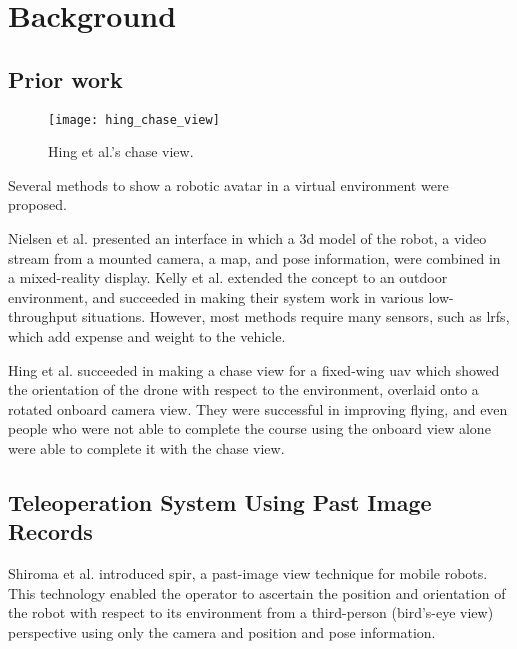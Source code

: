 \chapter{Background}
\label{ch:background}

\section{Prior work}

  \begin{wrapfigure}{r}{0.5\textwidth}
    \centering
    \texttt{[image: hing\_chase\_view]}
    \caption[Hing et al. chase view]{Hing et al.'s chase view.\cite{hing2009}}
    \label{fig:hing_chase_view}
  \end{wrapfigure}

  Several methods to show a robotic avatar in a virtual environment were proposed.

  Nielsen et al. presented an interface in which a \gls{3d} model of the robot, a video stream from a mounted camera, a map, and pose information, were combined in a mixed-reality display.\cite{nielsen2007}
  Kelly et al. extended the concept to an outdoor environment, and succeeded in making their system work in various low-throughput situations.\cite{kelly2011}
  However, most methods require many sensors, such as \glspl{lrf}, which add expense and weight to the vehicle.

  Hing et al. succeeded in making a chase view for a fixed-wing \gls{uav} which showed the orientation of the drone with respect to the environment, overlaid onto a rotated onboard camera view.\cite{hing2009}
  They were successful in improving flying, and even people who were not able to complete the course using the onboard view alone were able to complete it with the chase view.

\section{Teleoperation System Using Past Image Records}
  Shiroma et al. introduced \gls{spir}, a past-image view technique for mobile robots.\cite{shiroma2004}
  This technology enabled the operator to ascertain the position and orientation of the robot with respect to its environment from a third-person (bird's-eye view) perspective using only the camera and position and pose information.

